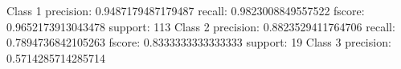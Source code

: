 \documentclass[12pt]{article}
\numberwithin{equation}{section}
\numberwithin{table}{section}
\numberwithin{figure}{section}
\begin{document}
\begin{python}
                                                                                                                Class  1                                                                                                                                                                                                                                          precision:  0.9487179487179487                                                                                                                                                                                                               recall:  0.9823008849557522                                                                                                                                                                                                                  fscore:  0.9652173913043478                                                                                                                                                                                                                  support:  113                                                                                                                                                                                                                                                                                                                                                                                                                                                                        Class  2                                                                                                                                                                                                                                          precision:  0.8823529411764706                                                                                                                                                                                                               recall:  0.7894736842105263                                                                                                                                                                                                                  fscore:  0.8333333333333333                                                                                                                                                                                                                  support:  19                                                                                                                                                                                                                                                                                                                                                                                                                                                                         Class  3                                                                                                                                                                                                                                          precision:  0.5714285714285714                                                                                             
\end{python}
\end{document}
